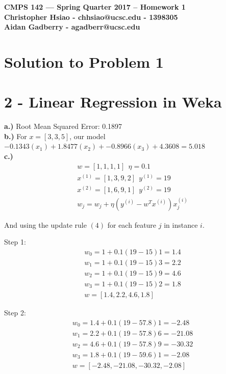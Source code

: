 \documentclass[11pt]{article}
\begin{document}
\begin{center}
{\bf\Large CMPS 142 --- Spring Quarter 2017 --  Homework 1}\\
{\bf Christopher Hsiao - chhsiao@ucsc.edu - 1398305}\\
{\bf Aidan Gadberry - agadberr@ucsc.edu}
\end{center}

\section*{Solution to Problem 1}

\section*{2 - Linear Regression in Weka}
\textbf{a.)} Root Mean Squared Error: 0.1897\\
\textbf{b.)} For $x = [3, 3, 5]$, our model $-0.1343(x_1) + 1.8477(x_2) + -0.8966(x_3) + 4.3608 = 5.018$\\
\textbf{c.)}
\begin{align}
w = [1, 1, 1, 1] \ \ \eta = 0.1 \\ 
x^{(1)} = [1, 3, 9, 2] \ \ y^{(1)} = 19 \\
x^{(2)} = [1, 6, 9, 1] \ \ y^{(2)} = 19 \\
w_j = w_j + \eta(y^{(i)} - w^Tx^{(i)})x^{(i)}_j
\end{align}
\begin{center}
And using the update rule $(4)$ for each feature $j$ in instance $i$.
\end{center}

Step 1: 
\begin{align*}
w_0 = 1 + 0.1(19 - 15)1 = 1.4\\
w_1 = 1 + 0.1(19 - 15)3 = 2.2\\
w_2 = 1 + 0.1(19 - 15)9 = 4.6\\
w_3 = 1 + 0.1(19 - 15)2 = 1.8\\
w = [1.4, 2.2, 4.6, 1.8]
\end{align*}

Step 2:
\begin{align*}
w_0 = 1.4 + 0.1(19 - 57.8)1 = -2.48\\
w_1 = 2.2 + 0.1(19 - 57.8)6 = -21.08\\
w_2 = 4.6 + 0.1(19 - 57.8)9 = -30.32\\
w_3 = 1.8 + 0.1(19 - 59.6)1= -2.08\\
w = [-2.48, -21.08, -30.32, -2.08]
\end{align*}
\end{document}

